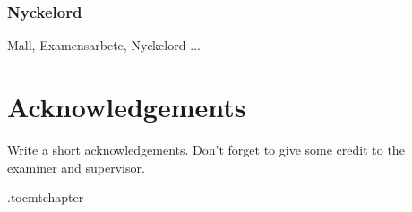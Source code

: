 \subsection*{Nyckelord}
Mall, Examensarbete, Nyckelord ...


\newpage
\thispagestyle{plain}
\chapter*{Acknowledgements}
Write a short acknowledgements. Don't forget to give some credit to the examiner and supervisor.

\newpage



\newpage

\etocdepthtag.toc{mtchapter}
\thispagestyle{plain}
\tableofcontents

\newpage


